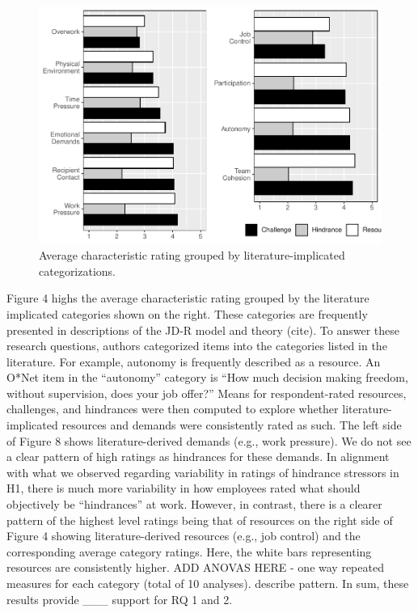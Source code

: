 \documentclass[
  english,
  man]{apa6}
\begin{document}
\begin{figure}
\centering
\includegraphics{Submission_files/figure-latex/scalelevelgraphs-1.pdf}
\caption{\label{fig:scalelevelgraphs}Average characteristic rating grouped by literature-implicated categorizations.}
\end{figure}

Figure 4 highs the average characteristic rating grouped by the literature implicated categories shown on the right. These categories are frequently presented in descriptions of the JD-R model and theory (cite). To answer these research questions, authors categorized items into the categories listed in the literature. For example, autonomy is frequently described as a resource. An O*Net item in the ``autonomy'' category is ``How much decision making freedom, without supervision, does your job offer?'' Means for respondent-rated resources, challenges, and hindrances were then computed to explore whether literature-implicated resources and demands were consistently rated as such. The left side of Figure 8 shows literature-derived demands (e.g., work pressure). We do not see a clear pattern of high ratings as hindrances for these demands. In alignment with what we observed regarding variability in ratings of hindrance stressors in H1, there is much more variability in how employees rated what should objectively be ``hindrances'' at work. However, in contrast, there is a clearer pattern of the highest level ratings being that of resources on the right side of Figure 4 showing literature-derived resources (e.g., job control) and the corresponding average category ratings. Here, the white bars representing resources are consistently higher. ADD ANOVAS HERE - one way repeated measures for each category (total of 10 analyses). describe pattern. In sum, these results provide \_\_\_ support for RQ 1 and 2.
\end{document}
